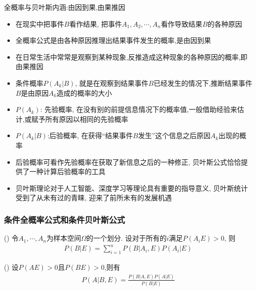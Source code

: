 \documentclass[Prob-All.tex]{subfiles}
\begin{document}
\begin{frame}{全概率与贝叶斯内涵:由因到果,由果推因}
	\begin{itemize}[<+-|alert@+>]
		\item 在现实中把事件$B$看作结果, 把事件$A_1,A_2,\cdots, A_n$看作导致结果$B$的各种原因
		\item 全概率公式是由各种原因推理出结果事件发生的概率,是由因到果
		\item 在日常生活中常常是观察到某种现象,反推造成这种现象的各种原因的概率,即由果推因
		\item 条件概率$P(A_k|B)$, 就是在观察到结果事件$B$已经发生的情况下,推断结果事件$B$是由原因$A_k$造成的概率的大小
		\item $P(A_k)$: 先验概率, 在没有别的前提信息情况下的概率值,一般借助经验来估计,或赋予所有原因以相同的先验概率
		\item $P(A_k|B)$:后验概率, 在获得“结果事件$B$发生”这个信息之后原因$A_k$出现的概率
		\item 后验概率可看作先验概率在获取了新信息之后的一种修正, 贝叶斯公式恰恰提供了一种计算后验概率的工具

		\item 贝叶斯理论对于人工智能、深度学习等理论具有重要的指导意义, 贝叶斯统计受到了从未有过的青睐, 迎来了前所未有的发展机遇
	\end{itemize}
\end{frame}

\begin{frame}
  \frametitle{条件全概率公式和条件贝叶斯公式}
  \vspace{0.2cm}
    \begin{thm} () 令$A_1,\cdots,A_n$为样本空间$\Omega$的一个划分. 设对于所有的$i$满足$P(A_iE)>0$, 则
   \begin{eqnarray*}
    P(B| E)=\sum_{i=1}^{n}P(B| A_{i},E)P(A_{i}| E)
    \end{eqnarray*}
    \end{thm}
    \pause
  \vspace{0.3cm}
  \begin{thm} () 设$P(AE)>0$且$P(BE)>0$,则有
   \begin{eqnarray*}
    P(A| B,E)=\frac{P(B| A,E)P(A| E)}{P(B| E)}
    \end{eqnarray*}
    \end{thm}

\end{frame}
\end{document}
